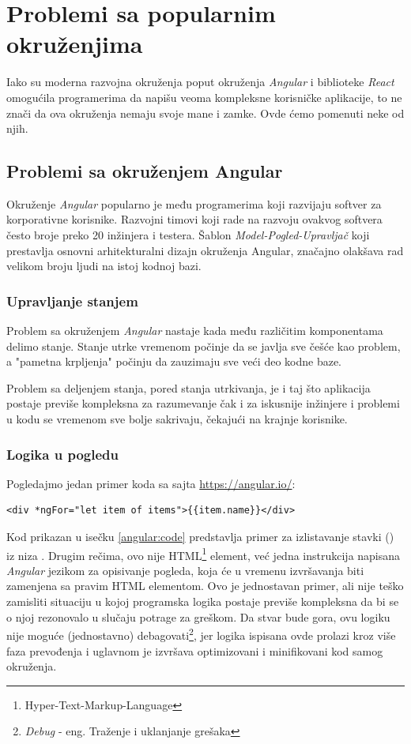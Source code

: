 \documentclass[12pt,oneside]{memoir}
\newcommand{\code}[1]{\colorbox{codegray}{\texttt{\scalebox{0.9}{#1}}}}%
\begin{document}
\chapter{Problemi sa popularnim okruženjima}\label{chap:problemi}
Iako su moderna razvojna okruženja poput okruženja \emph{Angular} i biblioteke \emph{React} omogućila
programerima da napišu veoma kompleksne korisničke aplikacije, to ne znači da ova okruženja
nemaju svoje mane i zamke. Ovde ćemo pomenuti neke od njih.
\section{Problemi sa okruženjem Angular}
Okruženje \emph{Angular} popularno je među programerima koji razvijaju softver za korporativne korisnike.
Razvojni timovi koji rade na razvoju ovakvog softvera često broje preko 20 inžinjera i testera.
Šablon \emph{Model-Pogled-Upravljač} koji prestavlja osnovni arhitekturalni dizajn okruženja Angular,
značajno olakšava rad velikom broju ljudi na istoj kodnoj bazi.
\subsection{Upravljanje stanjem} \label{subsec:upravljanje-stanjem}

Problem sa okruženjem \emph{Angular} nastaje kada među različitim komponentama delimo stanje. Stanje utrke vremenom počinje da
se javlja sve češće kao problem, a "pametna krpljenja" počinju da zauzimaju sve veći deo kodne baze.

Problem sa deljenjem stanja, pored stanja utrkivanja, je i taj što aplikacija postaje previše kompleksna
za razumevanje čak i za iskusnije inžinjere i problemi u kodu se vremenom sve bolje sakrivaju,
čekajući na krajnje korisnike.


\subsection{Logika u pogledu} \label{subsec:logika-u-pogledu}
Pogledajmo jedan primer koda sa sajta \url{https://angular.io/}:
\begin{lstlisting}[style=htmlStyle, caption={Isečak Angular koda},label=angular:code]
<div *ngFor="let item of items">{{item.name}}</div>
\end{lstlisting}
Kod prikazan u isečku \ref{angular:code} predstavlja primer za izlistavanje stavki (\code{item}) iz niza \code{items}.
Drugim rečima, ovo nije HTML\footnote{Hyper-Text-Markup-Language} element, već jedna instrukcija napisana \emph{Angular} jezikom za opisivanje
pogleda, koja će u vremenu izvršavanja biti zamenjena sa pravim HTML elementom.
Ovo je jednostavan primer, ali nije teško zamisliti situaciju u kojoj programska logika postaje previše kompleksna
da bi se o njoj rezonovalo u slučaju potrage za greškom. Da stvar bude gora, ovu logiku nije moguće (jednostavno) debagovati\footnote{\emph{Debug} - eng. Traženje i uklanjanje grešaka},
jer logika ispisana ovde prolazi kroz više faza prevođenja i uglavnom je izvršava
optimizovani i minifikovani kod samog okruženja.
\end{document}
